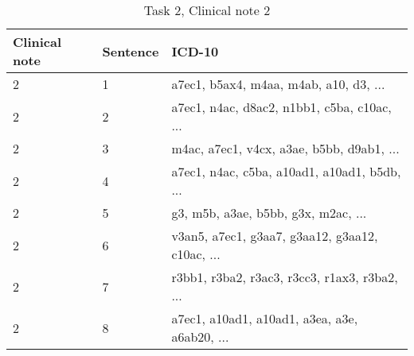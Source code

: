 \begin{table}[!htb] \footnotesize \center
\caption{Task 2, Clinical note 2 \label{tab:t2c2}}
\begin{tabularx}{\textwidth}{l l X}
    \toprule
    Clinical note & Sentence & ICD-10 \\
    \midrule
	 2 & 1 & a7ec1, b5ax4, m4aa, m4ab, a10, d3, ... \\
	 2 & 2 & a7ec1, n4ac, d8ac2, n1bb1, c5ba, c10ac, ... \\
	 2 & 3 & m4ac, a7ec1, v4cx, a3ae, b5bb, d9ab1, ... \\
	 2 & 4 & a7ec1, n4ac, c5ba, a10ad1, a10ad1, b5db, ... \\
	 2 & 5 & g3, m5b, a3ae, b5bb, g3x, m2ac, ... \\
	 2 & 6 & v3an5, a7ec1, g3aa7, g3aa12, g3aa12, c10ac, ... \\
	 2 & 7 & r3bb1, r3ba2, r3ac3, r3cc3, r1ax3, r3ba2, ... \\
	 2 & 8 & a7ec1, a10ad1, a10ad1, a3ea, a3e, a6ab20, ... \\
	\bottomrule
\end{tabularx}
\end{table}